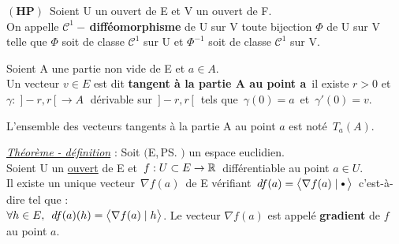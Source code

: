 \newpage

\(\left(\mathbf{HP}\right)\,\) Soient U un ouvert de E et V un ouvert de F.\vspace{0.1cm}\\
On appelle $\mathscr{C}^1-\,$\textbf{difféomorphisme} de U sur V toute bijection $\Phi$ de U sur V telle que $\Phi$ soit de classe $\mathscr{C}^1$ sur U et $\Phi^{-1}$ soit de classe $\mathscr{C}^1$ sur V.

\vspace{1.4cm}

Soient A une partie non vide de E et \(a\in A.\)\vspace{0.1cm}\\
Un vecteur \(v\in E\) est dit \textbf{tangent à la partie A au point a}\, \ssi il existe $r>0$ et\vspace{0.1cm}\\
\(\gamma:\;]-r,r\,[\,\to A\;\) dérivable sur \(\,]-r,r\,[\;\) tels que \(\,\gamma(0)=a\,\) et \(\,\gamma'(0)=v\).\vspace{0.2cm}\\
\begin{small}L'ensemble des vecteurs tangents à la partie A au point $a$ est noté \(\,T_a(A).\)\end{small}

\vspace{1.6cm}

\underline{\emph{Théorème - définition}} : Soit $\bigl($E,\,\ps$\bigr)$ un espace euclidien.\vspace{0.1cm}\\
Soient U un \underline{ouvert} de E et \(\,f:U\subset E\to \mathbb{R}\,\) différentiable au point \(a\in U\).\vspace{0.1cm}\\
Il existe un unique vecteur \(\,\nabla f(a)\,\) de E vérifiant \(\,df(a)=\psm{\nabla f(a)}{\sbullet[0.75]\,}\,\) c'est-à-dire tel que :\vspace{0.1cm}\\
\(\forall h\in E,\ \, df(a)(h)=\bigl\langle\nabla f(a)\mid h \bigr\rangle\). Le vecteur $\nabla f(a)$ est appelé \textbf{gradient} de $f$ au point $a$.

\vspace{2cm}


